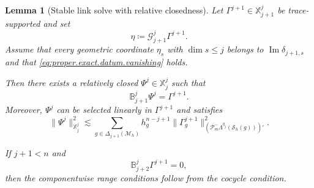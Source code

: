 \documentclass[a4paper,11pt]{article}
\newtheorem{lemma}[theorem]{Lemma}
\theoremstyle{definition}
\newcommand{\Mh}{\mathcal{M}_h}
\newcommand{\Sh}{\mathcal{S}_h}
\newcommand{\FM}[1]{\Delta_{#1}}
\newcommand{\PLtrim}[2]{\mathcal{P}_{#1}^{-}\Lambda^{#2}}
\begin{document}
\begin{lemma}[Stable link solve with relative closedness]
\label{lem:full.link.solve}
Let $\Gamma^{j+1}\in\mathbb X_{j+1}^j$ be trace-supported and set
\[
  \eta
  \coloneqq
  \mathcal G_{j+1}^j\Gamma^{j+1}.
\]
Assume that every geometric coordinate $\eta_s$ with $\dim s\leq j$ belongs to $\operatorname{Im}\delta_{j+1,s}$ and that \eqref{eq:proper.exact.datum.vanishing} holds.

Then there exists a relatively closed $\Psi^j\in\mathbb X_j^j$ such that
\begin{equation}\label{eq:full.link.equation}
  \mathbb B_{j+1}^j\Psi^j
  =
  \Gamma^{j+1}.
\end{equation}
Moreover, $\Psi^j$ can be selected linearly in $\Gamma^{j+1}$ and satisfies
\begin{equation}\label{eq:full.link.stability}
  \|\Psi^j\|_{\mathbb X_j^j}^2
  \lesssim
  \sum_{g\in\FM{j+1}(\Mh)}
  h_g^{n-j+1}
  \|\Gamma_g^{j+1}\|_{
    \left(
      \PLtrim{m}{q_j}(\Sh(g))
    \right)'
  }^2.
\end{equation}

If $j+1<n$ and
\begin{equation}\label{eq:full.link.cocycle}
  \mathbb B_{j+2}^j\Gamma^{j+1}=0,
\end{equation}
then the componentwise range conditions follow from the cocycle condition.
\end{lemma}
\end{document}
